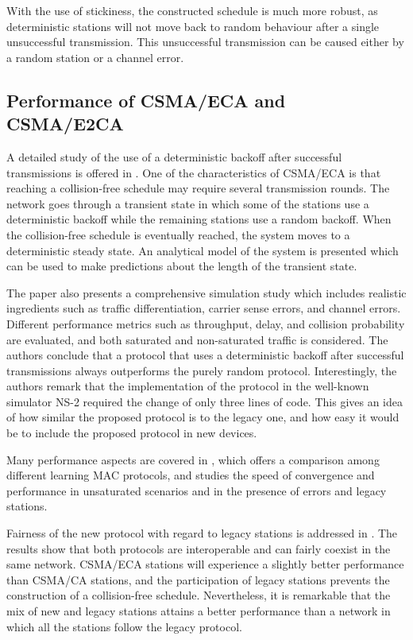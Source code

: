 \documentclass[journal]{IEEEtran}
\begin{document}
With the use of stickiness, the constructed schedule is much more robust, as deterministic stations will not move back to random behaviour after a single unsuccessful transmission.
This unsuccessful transmission can be caused either by a random station or a channel error.

\subsection{Performance of CSMA/ECA and CSMA/E2CA}

A detailed study of the use of a deterministic backoff after successful transmissions is offered in \cite{he2009srb}. 
One of the characteristics of CSMA/ECA is that reaching a collision-free schedule may require several transmission rounds.
The network goes through a transient state in which some of the stations use a deterministic backoff while the remaining stations use a random backoff.
When the collision-free schedule is eventually reached, the system moves to a deterministic steady state.
An analytical model of the system is presented \cite{he2009srb} which can be used to make predictions about the length of the transient state.

The paper also presents a comprehensive simulation study which includes realistic ingredients such as traffic differentiation, carrier sense errors, and channel errors.
Different performance metrics such as throughput, delay, and collision probability are evaluated, and both saturated and non-saturated traffic is considered.
The authors conclude that a protocol that uses a deterministic backoff after successful transmissions always outperforms the purely random protocol.
Interestingly, the authors remark that the implementation of the protocol in the well-known simulator NS-2 required the change of only three lines of code.
This gives an idea of how similar the proposed protocol is to the legacy one,  and how easy it would be to include the proposed protocol in new devices.

Many performance aspects are covered in \cite{fang2011dlm}, which offers a comparison among different learning MAC protocols, and studies the speed of convergence and performance in unsaturated scenarios and in the presence of errors and legacy stations.

Fairness of the new protocol with regard to legacy stations is addressed in \cite{barcelo2010fcc}.
The results show that both protocols are interoperable and can fairly coexist in the same network.
CSMA/ECA stations will experience a slightly better performance than CSMA/CA stations, and the participation of legacy stations prevents the construction of a collision-free schedule.
Nevertheless, it is remarkable that the mix of new and legacy stations attains a better performance than a network in which all the stations follow the legacy protocol.
\end{document}
